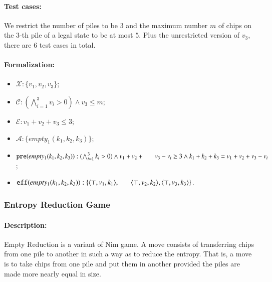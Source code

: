 \documentclass[review]{elsarticle}
\newcommand{\set}[1]{\{ #1 \}}
\newcommand{\tuple}[1]{\langle {#1} \rangle}
\newcommand{\true}{\top}
\newcommand{\statevar}{\mathcal{X}}
\newcommand{\act}{\mathcal{A}}
\newcommand{\constraint}{\mathcal{C}}
\newcommand{\estate}{\mathcal{E}}
\newcommand{\pre}{\mathtt{pre}}
\newcommand{\eff}{\mathtt{eff}}
\begin{document}
\paragraph{Test cases:}
We restrict the number of piles to be $3$ and the maximum number $m$ of chips on the $3$-th pile  of a legal state to be at most $5$.
Plus the unrestricted version of $v_3$, there are $6$ test cases in total.
\paragraph{Formalization:}

\begin{itemize}
	\item $\statevar: \set{v_1, v_2, v_3}$;
	\item $\constraint: (\bigwedge_{i=1}^{3} v_i > 0)\wedge v_3 \le m$;
	\item $\estate: v_1+ v_2 +v_3 \le 3$;
	\item $\act: \set{empty_1(k_1, k_2, k_3)}$;
	\item $\pre(empty_1(k_1, k_2, k_3)) :  (\bigwedge_{i=1}^{3} k_i > 0) \wedge
	v_1+v_2+ \\ \hspace*{6mm}
	v_3 - v_i \ge  3    \wedge k_1 + k_2 +k_3 = v_1+v_2+v_3 - v_i$;
	\item $\eff(empty_1(k_1, k_2, k_3)) : \set{\tuple{\true, v_1, k_1},\\ \hspace*{6mm}
		\tuple{\true,v_2,k_2},\tuple{\true,v_3,k_3}}$.
\end{itemize}



\subsubsection{Entropy Reduction Game \protect\cite{Fer1998}}

\paragraph{Description:} 
Empty Reduction is a variant of Nim game.
A move consists of transferring chips from one pile to another in such a way as to reduce the entropy. 
That is, a move is to take chips from one pile and put them in another provided the piles are made more nearly equal in size. 
\end{document}
